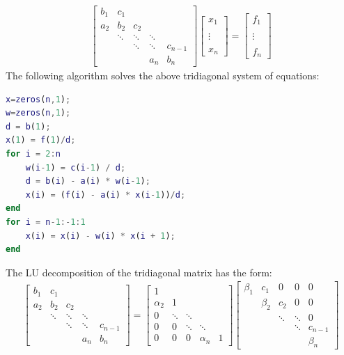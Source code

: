 \documentclass{article}
\begin{document}
\clearpage
\problem{}
\begin{align*}
    \begin{bmatrix}
        b_1 & c_1 & & & \\
        a_2 & b_2 & c_2 & & \\
        & \ddots & \ddots & \ddots & \\
        & & \ddots & \ddots & c_{n-1} \\
        & & & a_n & b_n
    \end{bmatrix}
    \begin{bmatrix}
        x_1 \\ \\ \vdots \\ \\ x_n
    \end{bmatrix}
    =
    \begin{bmatrix}
        f_1 \\ \\ \vdots \\ \\ f_n
    \end{bmatrix}
\end{align*}
The following algorithm solves the above tridiagonal system of equations:
\begin{lstlisting}[language=Matlab]
x=zeros(n,1);
w=zeros(n,1);
d = b(1);
x(1) = f(1)/d;
for i = 2:n
    w(i-1) = c(i-1) / d;
    d = b(i) - a(i) * w(i-1);
    x(i) = (f(i) - a(i) * x(i-1))/d;
end
for i = n-1:-1:1
    x(i) = x(i) - w(i) * x(i + 1);
end
\end{lstlisting}
The LU decomposition of the tridiagonal matrix has the form:
\begin{align*}
    \begin{bmatrix}
        b_1 & c_1 & & & \\
        a_2 & b_2 & c_2 & & \\
        & \ddots & \ddots & \ddots & \\
        & & \ddots & \ddots & c_{n-1} \\
        & & & a_n & b_n
    \end{bmatrix}
    = \begin{bmatrix}
        1 & & & & \\
        \alpha_2 & 1 & & & \\
        0 & \ddots & \ddots & & \\
        0 & 0 & \ddots & \ddots & \\
        0 & 0 & 0 & \alpha_n & 1
    \end{bmatrix}\begin{bmatrix}
        \beta_1 & c_1 & 0 & 0 & 0 \\
        & \beta_2 & c_2 & 0 & 0 \\
        & & \ddots & \ddots & 0 \\
        & & & \ddots & c_{n-1} \\
        & & & & \beta_n
    \end{bmatrix}
\end{align*}
\end{document}
